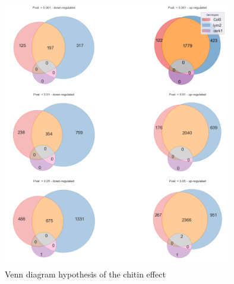 \documentclass[11pt]{article}
\begin{document}
\begin{figure}[htbp]
\centering
\includegraphics[width=10cm]{obipy-resources/vennTreatmentschitin.png}
\caption{\label{vennTreatments}
Venn diagram hypothesis of the chitin effect}
\end{figure}
\end{document}
